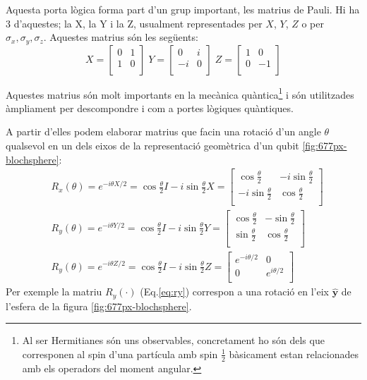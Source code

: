 Aquesta porta lògica forma part d'un grup important, les matrius de Pauli. Hi ha 3 d'aquestes; la X, la Y i la Z, usualment representades per $X$, $Y$, $Z$ o per $\sigma_x, \sigma_y, \sigma_z$. Aquestes matrius són les següents:
$$
	 X = \begin{bmatrix} 0 & 1\\ 1 & 0\\ \end{bmatrix} \; Y = \begin{bmatrix} 0 & i\\ -i & 0\\ \end{bmatrix} \; Z = \begin{bmatrix} 1 & 0\\ 0 & -1\\ \end{bmatrix} 
$$

Aquestes matrius són molt importants en la mecànica quàntica\footnote{Al ser Hermitianes són uns observables, concretament ho són dels que corresponen al spin d'una partícula amb spin $\frac{1}{2}$ bàsicament estan relacionades amb els operadors del moment angular.} i són utilitzades àmpliament per descompondre i com a portes lògiques quàntiques.

A partir d'elles podem elaborar matrius que facin una rotació d'un angle $\theta$ qualsevol en un dels eixos de la representació geomètrica d'un qubit \ref{fig:677px-blochsphere}:
\begin{align}
	& R_x(\theta) =  e^{-i\theta X/2} = \cos \frac{\theta}{2}I -i \sin \frac{\theta}{2}X = 
	\begin{bmatrix}
		\cos \frac{\theta}{2} & -i \sin \frac{\theta}{2} \\
		-i\sin \frac{\theta}{2} & \cos\frac{\theta}{2} \\
	\end{bmatrix} \label{eq:rx}\\
	& R_y(\theta) =  e^{-i\theta Y/2} = \cos \frac{\theta}{2}I -i \sin \frac{\theta}{2}Y = 
	\begin{bmatrix}
		\cos \frac{\theta}{2} & -\sin \frac{\theta}{2} \\
		\sin \frac{\theta}{2} & \cos\frac{\theta}{2} \\
	\end{bmatrix} \label{eq:ry}\\
	& R_y(\theta) =  e^{-i\theta Z/2} = \cos \frac{\theta}{2}I -i \sin \frac{\theta}{2}Z = 
	\begin{bmatrix}
		e^{-i\theta/2} & 0 \\
		0 & e^{i\theta/2} \\
	\end{bmatrix} \label{eq:rz}
\end{align}
Per exemple la matriu $R_y(\cdot)$ (Eq.\ref{eq:ry}) correspon a una rotació en l'eix $\hat{\mathbf{y}}$ de l'esfera de la figura \ref{fig:677px-blochsphere}.

